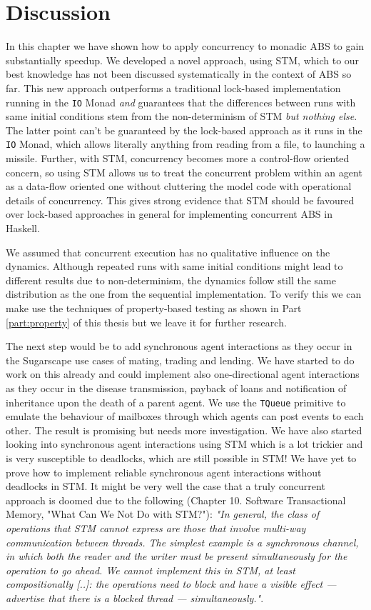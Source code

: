 \section{Discussion}
In this chapter we have shown how to apply concurrency to monadic ABS to gain substantially speedup. We developed a novel approach, using STM, which to our best knowledge has not been discussed systematically in the context of ABS so far. This new approach outperforms a traditional lock-based implementation running in the \texttt{IO} Monad \textit{and} guarantees that the differences between runs with same initial conditions stem from the non-determinism of STM \textit{but nothing else}. The latter point can't be guaranteed by the lock-based approach as it runs in the \texttt{IO} Monad, which allows literally anything from reading from a file, to launching a missile. Further, with STM, concurrency becomes more a control-flow oriented concern, so using STM allows us to treat the concurrent problem within an agent as a data-flow oriented one without cluttering the model code with operational details of concurrency. This gives strong evidence that STM should be favoured over lock-based approaches in general for implementing concurrent ABS in Haskell.

We assumed that concurrent execution has no qualitative influence on the dynamics. Although repeated runs with same initial conditions might lead to different results due to non-determinism, the dynamics follow still the same distribution as the one from the sequential implementation. To verify this we can make use the techniques of property-based testing as shown in Part \ref{part:property} of this thesis but we leave it for further research.

The next step would be to add synchronous agent interactions as they occur in the Sugarscape use cases of mating, trading and lending. We have started to do work on this already and could implement also one-directional agent interactions as they occur in the disease transmission, payback of loans and notification of inheritance upon the death of a parent agent. We use the \texttt{TQueue} primitive to emulate the behaviour of mailboxes through which agents can post events to each other. The result is promising but needs more investigation. We have also started looking into synchronous agent interactions using STM which is a lot trickier and is very susceptible to deadlocks, which are still possible in STM! We have yet to prove how to implement reliable synchronous agent interactions without deadlocks in STM. It might be very well the case that a truly concurrent approach is doomed due to the following \cite{marlow_parallel_2013} (Chapter 10. Software Transactional Memory, "What Can We Not Do with STM?"): \textit{"In general, the class of operations that STM cannot express are those that involve multi-way communication between threads. The simplest example is a synchronous channel, in which both the reader and the writer must be present simultaneously for the operation to go ahead. We cannot implement this in STM, at least compositionally [..]: the operations need to block and have a visible effect — advertise that there is a blocked thread — simultaneously."}. 

